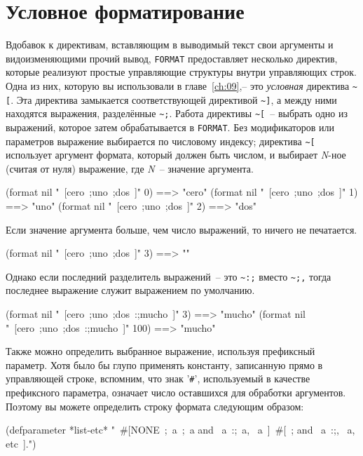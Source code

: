 \section{Условное форматирование}

Вдобавок к директивам, вставляющим в выводимый текст свои аргументы и видоизменяющими
прочий вывод, \lstinline{FORMAT} предоставляет несколько директив, которые реализуют простые
управляющие структуры внутри управляющих строк. Одна из них, которую вы использовали в
главе~\ref{ch:09},-- это \textit{условная} директива \lstinline!~[!. Эта директива
замыкается соответствующей директивой \lstinline!~]!, а между ними находятся выражения,
разделённые \lstinline!~;!. Работа директивы \lstinline!~[!~-- выбрать одно из выражений,
которое затем обрабатывается в \lstinline{FORMAT}. Без модификаторов или параметров выражение
выбирается по числовому индексу; директива \lstinline!~[! использует аргумент формата,
который должен быть числом, и выбирает \textit{N}-ное (считая от нуля) выражение, где
\textit{N}~-- значение аргумента.

\begin{myverb}
(format nil "~[cero~;uno~;dos~]" 0) ==> "cero"
(format nil "~[cero~;uno~;dos~]" 1) ==> "uno"
(format nil "~[cero~;uno~;dos~]" 2) ==> "dos"
\end{myverb}

Если значение аргумента больше, чем число выражений, то ничего не печатается.

\begin{myverb}
(format nil "~[cero~;uno~;dos~]" 3) ==> ""
\end{myverb}

Однако если последний разделитель выражений~-- это \lstinline!~:;! вместо \lstinline!~;,!
тогда последнее выражение служит выражением по умолчанию.

\begin{myverb}
(format nil "~[cero~;uno~;dos~:;mucho~]" 3)   ==> "mucho"
(format nil "~[cero~;uno~;dos~:;mucho~]" 100) ==> "mucho"
\end{myverb}

Также можно определить выбранное выражение, используя префиксный параметр. Хотя было бы
глупо применять константу, записанную прямо в управляющей строке, вспомним, что знак
'\lstinline!#!', используемый в качестве префиксного параметра, означает число оставшихся
для обработки аргументов. Поэтому вы можете определить строку формата следующим образом:

\begin{myverb}
(defparameter *list-etc*
  "~#[NONE~;~a~;~a and ~a~:;~a, ~a~]~#[~; and ~a~:;, ~a, etc~].")
\end{myverb}

